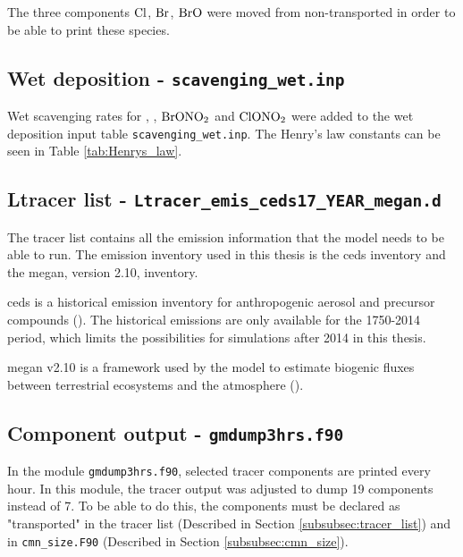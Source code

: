 The three components $\mathrm{Cl}$, $\mathrm{Br}$, $\mathrm{BrO}$ were moved from non-transported in order to be able to print these species. 

\subsection{Wet deposition - \texttt{scavenging\_wet.inp}}\label{sec:scav_wet}

Wet scavenging rates for , , $\mathrm{BrONO_2}$ and $\mathrm{ClONO_2}$ were added to the wet deposition input table \texttt{scavenging\_wet.inp}. The Henry's law constants can be seen in Table \ref{tab:Henrys_law}. 




\subsection{Ltracer list - \texttt{Ltracer\_emis\_ceds17\_YEAR\_megan.d}}\label{subsubsec:Ltracer_list}

The tracer list contains all the emission information that the model needs to be able to run. The emission inventory used in this thesis is the \acrlong{ceds} inventory and the \acrlong{megan}, version 2.10, inventory. 

\medskip

\acrshort{ceds} is a historical emission inventory for anthropogenic aerosol and precursor compounds (\cite{Lund2018}). The historical emissions are only available for the 1750-2014 period, which limits the possibilities for simulations after 2014 in this thesis. 

\medskip

\acrshort{megan} v2.10 is a framework used by the model to estimate biogenic fluxes between terrestrial ecosystems and the atmosphere (\cite{Guenther2012}). 


\subsection{Component output - \texttt{gmdump3hrs.f90}}\label{subsubsec:gmdump}


In the module \texttt{gmdump3hrs.f90}, selected tracer components are printed every hour. In this module, the tracer output was adjusted to dump 19 components instead of 7. To be able to do this, the components must be declared as "transported" in the tracer list (Described in Section \ref{subsubsec:tracer_list}) and in \texttt{cmn\_size.F90} (Described in Section \ref{subsubsec:cmn_size}).

